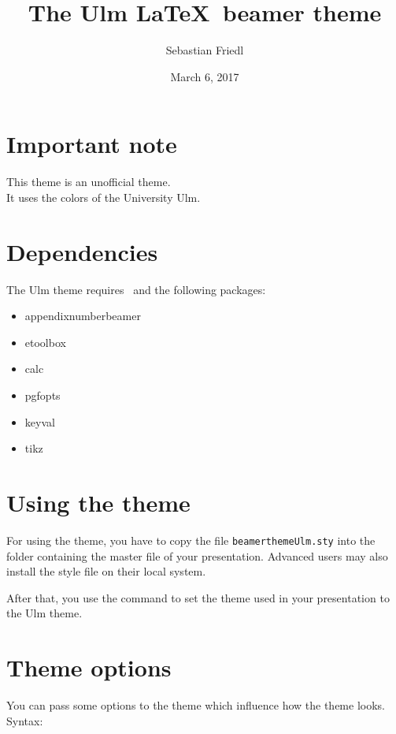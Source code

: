 \documentclass[12pt,a4paper]{scrartcl}
\title{The Ulm \LaTeX\ beamer theme}
\author{Sebastian Friedl}
\date{March 6, 2017}
\begin{document}
	\maketitle
	\thispagestyle{empty}
	
	
	\section*{Important note}
	This theme is an unofficial theme. \\
	It uses the colors of the University Ulm.
	
		
	\section*{Dependencies}
	The Ulm theme requires \LaTeXe\ and the following packages:
	\begin{itemize} \ttfamily
		\item appendixnumberbeamer
		\item etoolbox
		\item calc
		\item pgfopts
		\item keyval
		\item tikz
	\end{itemize}
	
	
	\section{Using the theme}
	For using the theme, you have to copy the file \texttt{beamerthemeUlm.sty} into the folder containing the master file of your presentation. Advanced users may also install the style file on their local system. \par
	After that, you use the command \texttt{} to set the theme used in your presentation to the Ulm theme.

	
	\section{Theme options}
	You can pass some options to the theme which influence how the theme looks. \\
	Syntax: \ \ \texttt{} \\\vspace{0.5ex}
	
\end{document}
